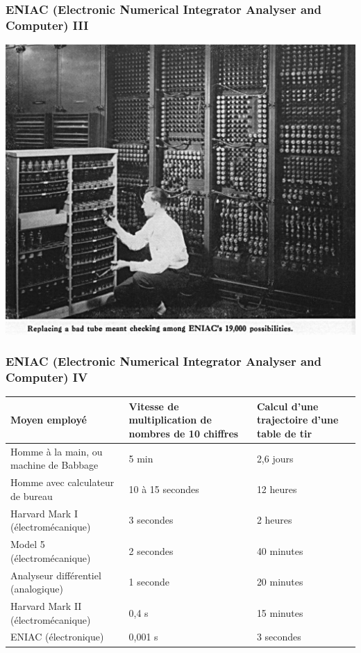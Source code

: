 \documentclass[utf8,10pt]{beamer}
\newcommand{\el}[1]{\hfill #1 \hfill}
\begin{document}
\begin{frame}
    \frametitle{ENIAC (Electronic Numerical Integrator Analyser and Computer) III}
    \begin{center}
        \includegraphics[scale=0.2]{./images/ENIAC-changing_a_tube}
    \end{center}
\end{frame}

    
\begin{frame}
    \frametitle{ENIAC (Electronic Numerical Integrator Analyser and Computer) IV}    
    \begin{center}
    {\footnotesize
        \begin{tabular}{p{} p{} p{}}
        \toprule
        Moyen employé&	Vitesse de multiplication de nombres de 10 chiffres	& Calcul d'une trajectoire 
        d'une table de tir \\
        \toprule
        Homme à la main, ou machine de Babbage & \el{5 min} & \el{2,6 jours} \\
        \midrule
        Homme avec calculateur de bureau & \el{10 à 15 secondes} & \el{12 heures} \\
        \midrule
        Harvard Mark I (électromécanique) & \el{3 secondes} & \el{2 heures} \\
       \midrule
        Model 5 (électromécanique) & \el{2 secondes} & \el{40 minutes}  \\
        \midrule
        Analyseur différentiel (analogique) & \el{1 seconde} & \el{20 minutes} \\
        \midrule
        Harvard Mark II (électromécanique) & \el{0,4 s} & \el{15 minutes} \\
        \midrule
        ENIAC (électronique)	 & \el{0,001 s} & \el{3 secondes}\\
        \bottomrule
        \end{tabular}
    }
    \end{center}


\end{frame}
\end{document}
